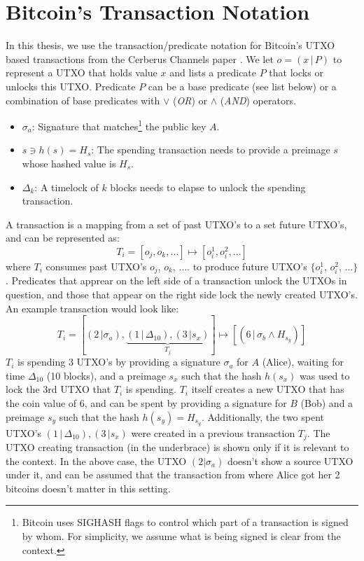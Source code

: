 \section{Bitcoin's Transaction Notation}
In this thesis, we use the transaction/predicate notation for Bitcoin's UTXO based transactions from the Cerberus Channels paper \cite{cerberus}. We let $o = (x\,|\,P)$ to represent a UTXO that holds value $x$ and lists a predicate $P$ that locks or unlocks this UTXO. Predicate $P$ can be a base predicate (see list below) or a combination of base predicates with $\lor$ (\textit{OR}) or $\land$ (\textit{AND}) operators.
\begin{itemize}
    \item $\sigma_a$: Signature that matches\footnote{Bitcoin uses SIGHASH flags to control which part of a transaction is signed by whom. For simplicity, we assume what is being signed is clear from the context.} the public key $A$.
    \item $s \ni h(s) = H_s$: The spending transaction needs to provide a preimage $s$ whose hashed value is $H_s$.
    \item $\Delta_k$: A timelock of $k$ blocks needs to elapse to unlock the spending transaction.
\end{itemize}
A transaction is a mapping from a set of past UTXO's to a set future UTXO's, and can be represented as:
$$T_i = [o_j, o_k, \ldots] \mapsto [o_i^1, o_i^2, \ldots]$$
where $T_i$ consumes past UTXO's $o_j$, $o_k$, $\ldots$. to produce future UTXO's $\{o_i^1$, $o_i^2$, $\ldots\}$. Predicates that apprear on the left side of a transaction unlock the UTXOs in question, and those that appear on the right side lock the newly created UTXO's. An example transaction would look like:
$$T_i = [(2\,|\sigma_a), \underbrace{(1\,|\,\Delta_{10}), (3\,|s_x)}_{T_j}] \mapsto [(6\,|\,\sigma_b \land H_{s_y})]$$
$T_i$ is spending 3 UTXO's by providing a signature $\sigma_a$ for $A$ (Alice), waiting for time $\Delta_{10}$ (10 blocks), and a preimage $s_x$ such that the hash $h(s_x)$ was used to lock the 3rd UTXO that $T_i$ is spending. $T_i$ itself creates a new UTXO that has the coin value of 6, and can be spent by providing a signature for $B$ (Bob) and a preimage $s_y$ such that the hash $h(s_y) = H_{s_y}$. Additionally, the two spent UTXO's $(1\,|\,\Delta_{10}), (3\,|s_x)$ were created in a previous transaction $T_j$. The UTXO creating transaction (in the underbrace) is shown only if it is relevant to the context. In the above case, the UTXO $(2|\sigma_a)$ doesn't show a source UTXO under it, and can be assumed that the transaction from where Alice got her 2 bitcoins doesn't matter in this setting. 

